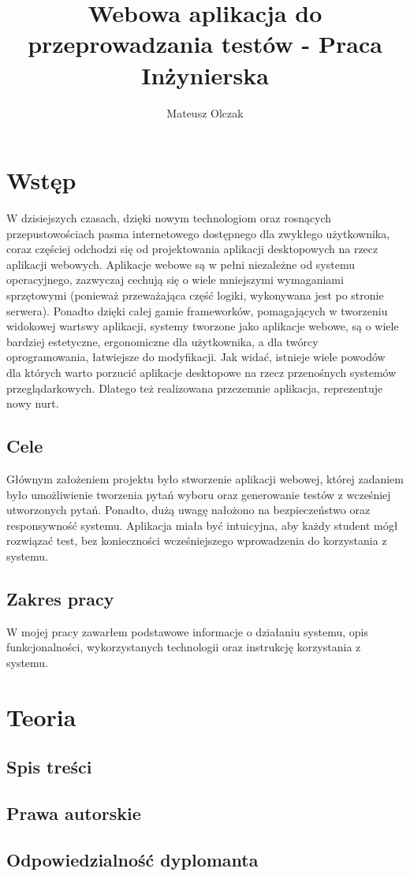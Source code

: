 \documentclass[a4paper, titlepage]{article}
\begin{document}
	\author{Mateusz Olczak}

	\title{Webowa aplikacja do przeprowadzania testów - Praca Inżynierska}
	
	\maketitle
	\newpage


	\section{\textbf{Wstęp}}

	W dzisiejszych czasach, dzięki nowym technologiom oraz rosnących przepustowościach pasma internetowego dostępnego dla zwykłego użytkownika, coraz częściej odchodzi się od projektowania aplikacji desktopowych na rzecz aplikacji webowych. Aplikacje webowe są w pełni niezależne od systemu operacyjnego, zazwyczaj cechują się o wiele mniejszymi wymaganiami sprzętowymi (ponieważ przeważająca część logiki, wykonywana jest po stronie serwera). Ponadto dzięki całej gamie frameworków, pomagających w tworzeniu widokowej wartswy aplikacji, systemy tworzone jako aplikacje webowe, są o wiele bardziej estetyczne, ergonomiczne dla użytkownika, a dla twórcy oprogramowania, łatwiejsze do modyfikacji. 
	Jak widać, istnieje wiele powodów dla których warto porzucić aplikacje desktopowe na rzecz przenośnych systemów przeglądarkowych. Dlatego też realizowana przezemnie aplikacja, reprezentuje nowy nurt.
	

	\subsection{Cele}
	Głównym założeniem projektu było stworzenie aplikacji webowej, której zadaniem było umożliwienie tworzenia pytań wyboru oraz generowanie testów z wcześniej utworzonych pytań.
	Ponadto, dużą uwagę nałożono na bezpieczeństwo oraz responsywność systemu. Aplikacja miała być intuicyjna, aby każdy student mógł rozwiązać test, bez konieczności wcześniejszego wprowadzenia do korzystania z systemu. 
	\subsection{Zakres pracy}
	W mojej pracy zawarłem podstawowe informacje o działaniu systemu, opis funkcjonalności, wykorzystanych technologii oraz instrukcję korzystania z systemu.
	
	\section{\textbf{Teoria}}
	\subsection{Spis treści}
	\subsection{Prawa autorskie}
	\subsection{Odpowiedzialność dyplomanta}
	
\end{document}
